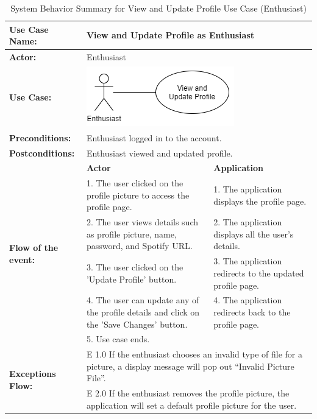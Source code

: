 \begin{longtable}{|p{3cm}|p{5cm}|p{5cm}|}
    \caption{\centering System Behavior Summary for View and Update Profile Use Case (Enthusiast)} \\
    \hline
    \textbf{Use Case Name:} & \multicolumn{2}{l|}{View and Update Profile as Enthusiast} \\ \hline
    \textbf{Actor:} & \multicolumn{2}{l|}{Enthusiast} \\ \hline
    \textbf{Use Case:} & \multicolumn{2}{l|}{\includegraphics[width=0.5\linewidth]{mainmatter/images/sucd9.png}} \\ \hline
    \textbf{Preconditions:} & \multicolumn{2}{p{10cm}|}{Enthusiast logged in to the account.} \\ \hline
    \textbf{Postconditions:} & \multicolumn{2}{p{10cm}|}{Enthusiast viewed and updated profile.} \\ \hline
    \multirow{6}{3cm}{\raggedright \textbf{Flow of the event:}} & \textbf{Actor} & \textbf{Application} \\ \cline{2-3}
    & 1. The user clicked on the profile picture to access the profile page. & 1. The application displays the profile page. \\ \cline{2-3}
    & 2. The user views details such as profile picture, name, password, and Spotify URL. & 2. The application displays all the user's details.  \\ \cline{2-3}
    & 3. The user clicked on the 'Update Profile' button. & 3. The application redirects to the updated profile page.  \\ \cline{2-3}
    & 4. The user can update any of the profile details and click on the 'Save Changes' button. & 4. The application redirects back to the profile page. \\ \cline{2-3}
    & 5. Use case ends. & \\ \hline
    \multirow{2}{3cm}{\raggedright \textbf{Exceptions Flow:}} & \multicolumn{2}{p{10cm}|}{\raggedright E 1.0 If the enthusiast chooses an invalid type of file for a picture, a display message will pop out “Invalid Picture File”.} \\ \cline{2-3}
    & \multicolumn{2}{p{10cm}|}{\raggedright E 2.0 If the enthusiast removes the profile picture, the application will set a default profile picture for the user.} \\ \hline
\end{longtable}
\pagebreak

